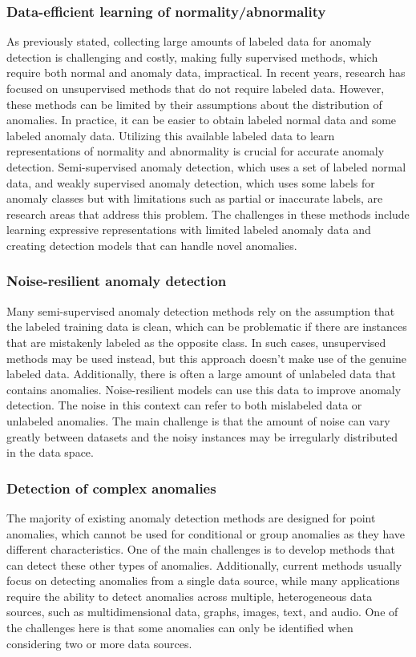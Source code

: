 \subsubsection{Data-efficient learning of normality/abnormality}
As previously stated, collecting large amounts of labeled data for anomaly detection is challenging and costly, making fully supervised methods, which require both normal and anomaly data, impractical. In recent years, research has focused on unsupervised methods that do not require labeled data. However, these methods can be limited by their assumptions about the distribution of anomalies. 
In practice, it can be easier to obtain labeled normal data and some labeled anomaly data. Utilizing this available labeled data to learn representations of normality and abnormality is crucial for accurate anomaly detection. Semi-supervised anomaly detection, which uses a set of labeled normal data, and weakly supervised anomaly detection, which uses some labels for anomaly classes but with limitations such as partial or inaccurate labels, are research areas that address this problem. The challenges in these methods include learning expressive representations with limited labeled anomaly data and creating detection models that can handle novel anomalies.

\subsubsection{Noise-resilient anomaly detection}
Many semi-supervised anomaly detection methods rely on the assumption that the labeled training data is clean, which can be problematic if there are instances that are mistakenly labeled as the opposite class. In such cases, unsupervised methods may be used instead, but this approach doesn't make use of the genuine labeled data. Additionally, there is often a large amount of unlabeled data that contains anomalies. Noise-resilient models can use this data to improve anomaly detection. The noise in this context can refer to both mislabeled data or unlabeled anomalies. The main challenge is that the amount of noise can vary greatly between datasets and the noisy instances may be irregularly distributed in the data space.

\subsubsection{Detection of complex anomalies}
The majority of existing anomaly detection methods are designed for point anomalies, which cannot be used for conditional or group anomalies as they have different characteristics. One of the main challenges is to develop methods that can detect these other types of anomalies. Additionally, current methods usually focus on detecting anomalies from a single data source, while many applications require the ability to detect anomalies across multiple, heterogeneous data sources, such as multidimensional data, graphs, images, text, and audio. One of the challenges here is that some anomalies can only be identified when considering two or more data sources.

